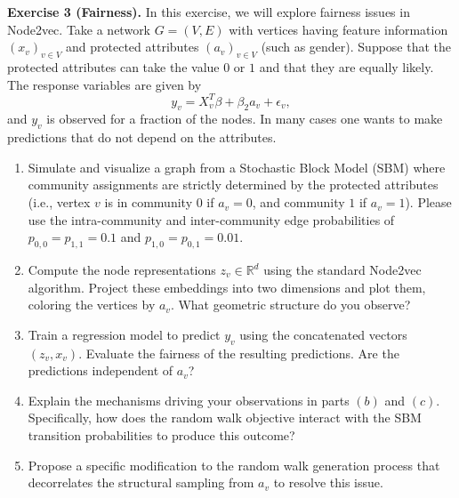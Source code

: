 \documentclass{article}
\begin{document}
\vspace{8pt}

\begin{tcolorbox}[colback = gray!16, enhanced, boxrule=0pt, frame hidden, sharp corners, borderline west={3pt}{-1.5pt}{black!80}, breakable]
\textbf{Exercise 3 (Fairness).} In this exercise, we will explore fairness issues in Node2vec. Take a network $G=(V,E)$ with vertices having feature information $(x_v)_{v\in V}$ and protected attributes $(a_v)_{v\in V}$ (such as gender). Suppose that the protected attributes can take the value $0$ or $1$ and that they are equally likely. The response variables are given by
\[
y_v=X_v^T\beta+\beta_2a_v+\epsilon_v,
\]
and $y_v$ is observed for a fraction of the nodes. In many cases one wants to make predictions that do not depend on the attributes.
\begin{enumerate}[$(a)$]
    \item Simulate and visualize a graph from a Stochastic Block Model (SBM) where community assignments are strictly determined by the protected attributes (i.e., vertex $v$ is in community $0$ if $a_v = 0$, and community $1$ if $a_v = 1$). Please use the intra-community and inter-community edge probabilities of $p_{0,0} = p_{1,1} = 0.1$ and $p_{1,0} = p_{0,1} = 0.01$.
    \item Compute the node representations $z_v \in \mathbb{R}^d$ using the standard Node2vec algorithm. Project these embeddings into two dimensions and plot them, coloring the vertices by $a_v$. What geometric structure do you observe?
    \item Train a regression model to predict $y_v$ using the concatenated vectors $(z_v, x_v)$. Evaluate the fairness of the resulting predictions. Are the predictions independent of $a_v$?
    \item Explain the mechanisms driving your observations in parts $(b)$ and $(c)$. Specifically, how does the random walk objective interact with the SBM transition probabilities to produce this outcome?
    \item Propose a specific modification to the random walk generation process that decorrelates the structural sampling from $a_v$ to resolve this issue.
\end{enumerate}
\end{tcolorbox}
\end{document}
